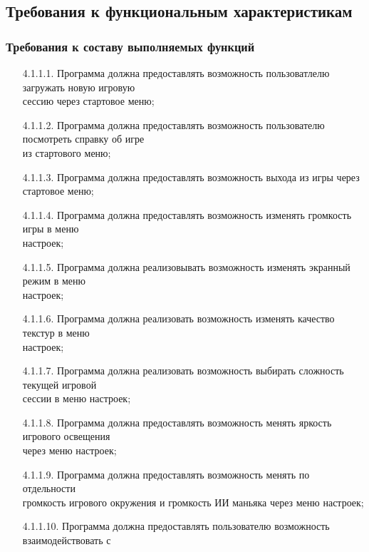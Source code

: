 \subsection{Требования к функциональным характеристикам}

\subsubsection{Требования к составу выполняемых функций}

\begin{enumerate}
    \item[4.1.1.1.] Программа должна предоставлять возможность пользоватлелю загружать новую игровую\\
    сессию через стартовое меню;
    \item[4.1.1.2.] Программа должна предоставлять возможность пользователю посмотреть справку об игре\\
    из стартового меню;
    \item[4.1.1.3.] Программа должна предоставлять возможность выхода из игры через стартовое меню;
    \item[4.1.1.4.] Программа должна предоставлять возможность изменять громкость игры в меню \\настроек;
    \item[4.1.1.5.] Программа должна реализовывать возможность изменять экранный режим в меню \\настроек;
    \item[4.1.1.6.] Программа должна реализовать возможность изменять качество текстур в меню \\ настроек;
    \item[4.1.1.7.] Программа должна реализовать возможность выбирать сложность текущей игровой\\ 
    сессии в меню настроек;
    \item[4.1.1.8.] Программа должна предоставлять возможность менять яркость игрового освещения\\
    через меню настроек;
    \item[4.1.1.9.] Программа должна предоставлять возможность менять по отдельности\\
    громкость игрового окружения и громкость ИИ маньяка через меню настроек;
    \item[4.1.1.10.] Программа должна предоставлять пользователю возможность взаимодействовать с \\

\end{enumerate}
